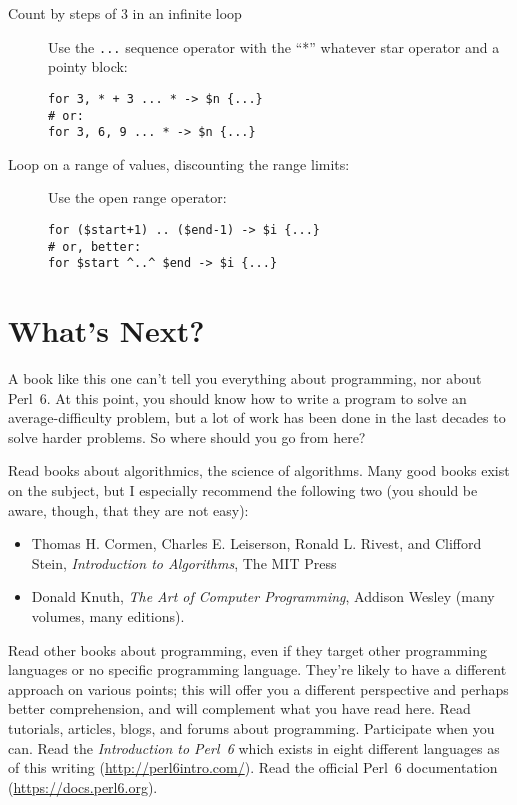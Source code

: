 \begin{description}
\item[Count by steps of 3 in an infinite loop] Use the \verb'...' 
sequence operator with the ``*'' whatever star operator and 
a pointy block:

\begin{verbatim}
for 3, * + 3 ... * -> $n {...}
# or:
for 3, 6, 9 ... * -> $n {...}    
\end{verbatim}

\item[Loop on a range of values, discounting the range limits:] Use 
the open range operator:

\begin{verbatim}
for ($start+1) .. ($end-1) -> $i {...}
# or, better:
for $start ^..^ $end -> $i {...}
\end{verbatim}
\end{description}

\section{What's Next?}

A book like this one can't tell you everything about programming,  
nor about Perl~6. At this point, you should know how to write a 
program to solve an average-difficulty problem, but a lot of work 
has been done in the last decades to solve harder problems. So 
where should you go from here?

Read books about algorithmics, the science of algorithms. Many good 
books exist on the subject, but I especially recommend the following 
two (you should be aware, though, that they are not easy):
\begin{itemize}
\item Thomas H. Cormen, Charles E. Leiserson, Ronald L. Rivest, 
and Clifford Stein, \emph{Introduction to 
Algorithms}, The MIT Press
\item Donald Knuth, \emph{The Art of Computer Programming}, Addison Wesley 
(many volumes, many editions).
\end{itemize}

Read other books about programming, even if they 
target other programming languages or no specific programming 
language. They're likely to have a 
different approach on various points; this will offer you a 
different perspective and perhaps better comprehension, and 
will complement what you have read here. 
Read tutorials, articles, blogs, and forums about programming. 
Participate when you can. Read the \emph{Introduction to 
Perl~6} which exists in eight different languages as of 
this writing (\url{http://perl6intro.com/}). Read the 
official Perl~6 documentation (\url{https://docs.perl6.org}).

